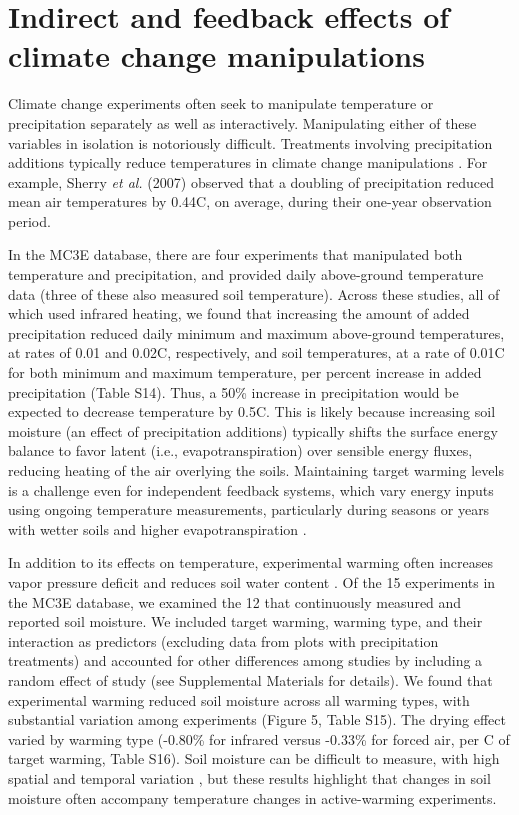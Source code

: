 \documentclass{article}
\begin{document}
\section* {Indirect and feedback effects of climate change manipulations} 
Climate change experiments often seek to manipulate temperature or precipitation separately as well as interactively. Manipulating either of these variables in isolation is notoriously difficult. Treatments involving precipitation additions typically reduce temperatures in climate change manipulations \citep{sherry2007,rollinson2012,mcdaniel2014}. For example, Sherry \emph{et al.} (2007) observed that a doubling of precipitation reduced mean air temperatures by 0.44\degree C, on average, during their one-year observation period. 
\par In the MC3E database, there are four experiments that manipulated both temperature and precipitation, and provided daily above-ground temperature data (three of these also measured soil temperature). Across these studies, all of which used infrared heating, we found that increasing the amount of added precipitation reduced daily minimum and maximum above-ground temperatures, at rates of 0.01 and 0.02\degree C, respectively, and soil temperatures, at a rate of 0.01\degree C for both minimum and maximum temperature, per percent increase in added precipitation (Table S14). Thus, a 50\% increase in precipitation would be expected to decrease temperature by 0.5\degree C.
This is likely because increasing soil moisture (an effect of precipitation additions) typically shifts the surface energy balance to favor latent (i.e., evapotranspiration) over sensible energy fluxes, reducing heating of the air overlying the soils. Maintaining target warming levels is a challenge even for independent feedback systems, which vary energy inputs using ongoing temperature measurements, particularly during seasons or years with wetter soils and higher evapotranspiration \citep{rich2015}.
\par In addition to its effects on temperature, experimental warming often increases vapor pressure deficit and reduces soil water content \citep[e.g.,][]{harte1995b,sherry2007,morin2010,pelini2014,templer2016}. Of the 15 experiments in the MC3E database, we examined the 12 that continuously measured and reported soil moisture. We included target warming, warming type, and their interaction as predictors (excluding data from plots with precipitation treatments) and accounted for other differences among studies by including a random effect of study (see Supplemental Materials for details). We found that experimental warming reduced soil moisture across all warming types, with substantial variation among experiments (Figure 5, Table S15). The drying effect varied by warming type (-0.80\% for infrared versus -0.33\% for forced air, per \degree C of target warming, Table S16). Soil moisture can be difficult to measure, with high spatial and temporal variation \citep{famiglietti1999,teuling2005}, but these results highlight that changes in soil moisture often accompany temperature changes in active-warming experiments.
\end{document}
